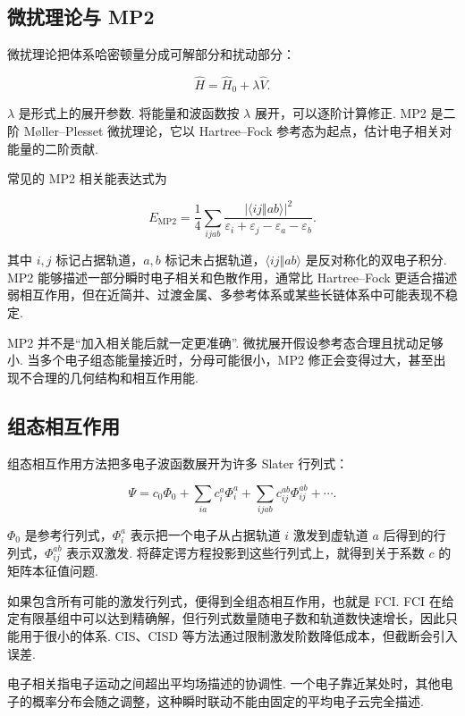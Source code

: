\documentclass[UTF8,11pt,a4paper,openany]{ctexbook}
\begin{document}
\subsection{微扰理论与 MP2}

微扰理论把体系哈密顿量分成可解部分和扰动部分：

\[
\hat H=\hat H_0+\lambda\hat V.
\]

$\lambda$ 是形式上的展开参数. 将能量和波函数按 $\lambda$ 展开，可以逐阶计算修正. MP2 是二阶 Møller--Plesset 微扰理论，它以 Hartree--Fock 参考态为起点，估计电子相关对能量的二阶贡献. 

常见的 MP2 相关能表达式为

\[
E_{\mathrm{MP2}}
=
\frac{1}{4}
\sum_{ijab}
\frac{|\langle ij\Vert ab\rangle|^2}
{\varepsilon_i+\varepsilon_j-\varepsilon_a-\varepsilon_b}.
\]

其中 $i,j$ 标记占据轨道，$a,b$ 标记未占据轨道，$\langle ij\Vert ab\rangle$ 是反对称化的双电子积分. MP2 能够描述一部分瞬时电子相关和色散作用，通常比 Hartree--Fock 更适合描述弱相互作用，但在近简并、过渡金属、多参考体系或某些长链体系中可能表现不稳定. 

\begin{limitbox}
MP2 并不是“加入相关能后就一定更准确”. 微扰展开假设参考态合理且扰动足够小. 当多个电子组态能量接近时，分母可能很小，MP2 修正会变得过大，甚至出现不合理的几何结构和相互作用能. 
\end{limitbox}

\subsection{组态相互作用}

组态相互作用方法把多电子波函数展开为许多 Slater 行列式：

\[
\Psi
=
c_0\Phi_0+\sum_{ia}c_i^a\Phi_i^a
+\sum_{ijab}c_{ij}^{ab}\Phi_{ij}^{ab}+\cdots.
\]

$\Phi_0$ 是参考行列式，$\Phi_i^a$ 表示把一个电子从占据轨道 $i$ 激发到虚轨道 $a$ 后得到的行列式，$\Phi_{ij}^{ab}$ 表示双激发. 将薛定谔方程投影到这些行列式上，就得到关于系数 $c$ 的矩阵本征值问题. 

如果包含所有可能的激发行列式，便得到全组态相互作用，也就是 FCI. FCI 在给定有限基组中可以达到精确解，但行列式数量随电子数和轨道数快速增长，因此只能用于很小的体系. CIS、CISD 等方法通过限制激发阶数降低成本，但截断会引入误差. 

\begin{definitionbox}
电子相关指电子运动之间超出平均场描述的协调性. 一个电子靠近某处时，其他电子的概率分布会随之调整，这种瞬时联动不能由固定的平均电子云完全描述. 
\end{definitionbox}
\end{document}
